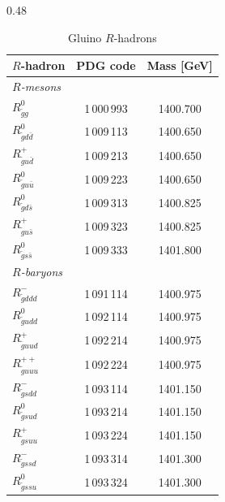 \newpage





\newpage

\begin{table}[h]
    \centering
    \footnotesize
    \begin{subtable}[t]{0.48\textwidth}
        \centering
        \caption{Gluino $R$-hadrons}
        \label{tab:rhadrons_gluino}
        \renewcommand{\arraystretch}{1.15}
        \begin{tabular}{lcc}
        \toprule
        $R$-hadron & PDG code & Mass [GeV] \\
        \midrule
        \multicolumn{3}{l}{\textit{$R$-mesons}} \\[0.15em]
        $R^0_{\tilde{g}g}$        & 1\,000\,993 & 1400.700 \\
        $R^0_{\tilde{g}d\bar{d}}$ & 1\,009\,113 & 1400.650 \\
        $R^+_{\tilde{g}u\bar{d}}$ & 1\,009\,213 & 1400.650 \\
        $R^0_{\tilde{g}u\bar{u}}$ & 1\,009\,223 & 1400.650 \\
        $R^0_{\tilde{g}d\bar{s}}$ & 1\,009\,313 & 1400.825 \\
        $R^+_{\tilde{g}u\bar{s}}$ & 1\,009\,323 & 1400.825 \\
        $R^0_{\tilde{g}s\bar{s}}$ & 1\,009\,333 & 1401.800 \\
        \midrule
        \multicolumn{3}{l}{\textit{$R$-baryons}} \\[0.15em]
        $R^-_{\tilde{g}ddd}$    & 1\,091\,114 & 1400.975 \\
        $R^0_{\tilde{g}udd}$    & 1\,092\,114 & 1400.975 \\
        $R^+_{\tilde{g}uud}$    & 1\,092\,214 & 1400.975 \\
        $R^{++}_{\tilde{g}uuu}$ & 1\,092\,224 & 1400.975 \\
        $R^-_{\tilde{g}sdd}$    & 1\,093\,114 & 1401.150 \\
        $R^0_{\tilde{g}sud}$    & 1\,093\,214 & 1401.150 \\
        $R^+_{\tilde{g}suu}$    & 1\,093\,224 & 1401.150 \\
        $R^-_{\tilde{g}ssd}$    & 1\,093\,314 & 1401.300 \\
        $R^0_{\tilde{g}ssu}$    & 1\,093\,324 & 1401.300 \\

\end{tabular}
\end{subtable}
\end{table}
